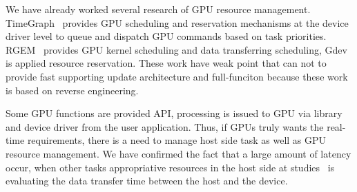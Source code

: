 We have already worked several research of GPU resource management.
TimeGraph~\cite{kato:timegraph} provides GPU scheduling and reservation mechanisms at the device driver level to queue and dispatch GPU commands based on task priorities.
RGEM~\cite{kato:rgem} provides GPU kernel scheduling and data transferring scheduling,
Gdev~\cite{kato:gdev} is applied resource reservation.
These work have weak point that can not to provide fast supporting update architecture and full-funciton because these work is based on reverse engineering.

Some GPU functions are provided API, processing is issued to GPU via library and device driver from the user application.
Thus, if GPUs truly wants the real-time requirements,  there is a need to manage host side task as well as GPU resource management.
We have confirmed the fact that a large amount of latency occur,
when other tasks appropriative resources in the host side at studies~\cite{fujii:icpads2013} is evaluating the data transfer time between the host and the device.

